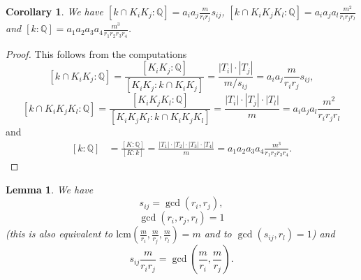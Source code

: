 \documentclass[12pt,a4paper]{article}
\newtheorem{lemma}[theorem]{Lemma}
\newtheorem{cor}[theorem]{Corollary}
\newcommand{\Q}{\mathbb{Q}}
\newcommand{\lcm}{\mathrm{lcm}}
\begin{document}
\begin{cor}\label{compcap}
We have $[k\cap K_iK_j:\Q]=a_ia_j\frac{m}{r_ir_j}s_{ij}$, $[k\cap K_iK_jK_l:\Q]=a_ia_ja_l\frac{m^2}{r_ir_jr_l}$ and $[k:\Q]=a_1a_2a_3a_4\frac{m^3}{r_1r_2r_3r_4}$.
\end{cor}
\begin{proof}
This follows from the computations
$$[k\cap K_iK_j:\Q]=\frac{[K_iK_j:\Q]}{[K_iK_j:k\cap K_iK_j]}=\frac{|T_i|\cdot|T_j|}{m/s_{ij}}=a_ia_j\frac{m}{r_ir_j}s_{ij},$$
$$[k\cap K_iK_jK_l:\Q]=\frac{[K_iK_jK_l:\Q]}{[K_iK_jK_l:k\cap K_iK_jK_l]}=\frac{|T_i|\cdot|T_j|\cdot|T_l|}{m}=a_ia_ja_l\frac{m^2}{r_ir_jr_l}$$
and
\begin{equation*}
\begin{split}
[k:\Q]&=\frac{[K:\Q]}{[K:k]}=\frac{|T_1|\cdot|T_2|\cdot|T_3|\cdot|T_4|}{m}=
a_1a_2a_3a_4\frac{m^3}{r_1r_2r_3r_4}.
\end{split}
\end{equation*}

\end{proof}
\begin{lemma}\label{coprime}
We have $$s_{ij}=\gcd(r_i,r_j),$$ $$\gcd(r_i,r_j,r_l)=1$$ (this is also equivalent to $\lcm\left(\frac{m}{r_i},\frac{m}{r_j},\frac{m}{r_l}\right)=m$ and to $\gcd(s_{ij},r_l)=1$) and $$s_{ij}\frac{m}{r_ir_j}=\gcd(\frac{m}{r_i},\frac{m}{r_j}).$$
\end{lemma}
\end{document}
